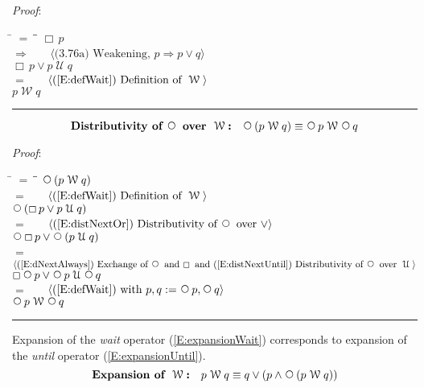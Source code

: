 \documentclass[12pt, fleqn, leqno]{article}
\newcommand{\lgap}{2pt}                             %
\newcommand{\mymathindent}{24pt}                    %
\newcommand{\impl}{\ensuremath{\Rightarrow}}        %
\newcommand{\Until}{\;\mathcal{U}\;}
\newcommand{\Wait}{\;\mathcal{W}\;}
\newcommand{\Next}{\;\,\text{\raisebox{3.5pt}{\circle{6}}}}
\newcommand{\Always}{\Box\,}
\newcommand{\myqed}{\rule[-.23ex]{1.2ex}{2.0ex}}
\newcommand{\myqedtab}{\hspace{384pt}}              %
\newcommand{\Gll} {\langle}                         %
\newcommand{\Ggg} {\rangle}                         %
\newcommand{\Hint}[1]     {\ \ \ $\Gll              \mbox{#1} \Ggg$ }   %
\begin{document}
\emph{Proof}:
\begin{tabbing}
\hspace{\mymathindent} \= $= \;$ \= \myqedtab \= \kill
\> \> $\Always p$\\[\lgap]
\> $\impl$ \> \Hint{(3.76a) Weakening, $p\impl p\lor q$} \\[\lgap]
\> \> $\Always p \lor p \Until q$\\[\lgap]
\> $=$ \> \Hint{(\ref{E:defWait}) Definition of $\Wait$} \\[\lgap]
\> \> $p \Wait q$ \quad \myqed
\end{tabbing}
\begin{equation}\label{E:waitNextDist}
\textbf{Distributivity of $\Next$ over $\Wait$:}\quad \Next (p \Wait q) \equiv \Next p \Wait \Next q
\end{equation}

\emph{Proof}:
\begin{tabbing}
\hspace{\mymathindent} \= $= \;$ \= \myqedtab \= \kill
\> \> $\Next (p \Wait q)$\\[\lgap]
\> $=$ \> \Hint{(\ref{E:defWait}) Definition of $\Wait$} \\[\lgap]
\> \> $\Next(\Always p\lor p\Until q)$\\[\lgap]
\> $=$ \> \Hint{(\ref{E:distNextOr}) Distributivity of $\Next$ over $\lor$} \\[\lgap]
\> \> $\Next \Always p\lor \Next(p\Until q)$\\[\lgap]
\> $=$ \> \Hint{(\ref{E:dNextAlways}) Exchange of $\Next$ and $\Always$ and (\ref{E:distNextUntil}) Distributivity of $\Next$ over $\Until$} \\[\lgap]
\> \> $\Always \Next p\lor \Next p\Until \Next q$\\[\lgap]
\> $=$ \> \Hint{(\ref{E:defWait}) with $p,q := \Next p, \Next q$} \\[\lgap]
\> \> $\Next p \Wait \Next q$ \quad \myqed
\end{tabbing}

Expansion of the \textit{wait} operator (\ref{E:expansionWait}) corresponds to expansion of the \textit{until} operator (\ref{E:expansionUntil}).
\begin{equation}\label{E:expansionWait}
\textbf{Expansion of $\Wait$:}\quad p \Wait q \equiv q \lor (p \land \Next (p \Wait q))
\end{equation}
\end{document}
